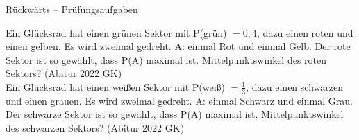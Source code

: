 \begin{aufgabe}{Rückwärts – Prüfungsaufgaben}
\begin{teile}
\teil Ein Glücksrad hat einen grünen Sektor mit P(grün) $= 0{,}4$, dazu einen roten und einen gelben. Es wird zweimal gedreht. A: einmal Rot und einmal Gelb. Der rote Sektor ist so gewählt, dass P(A) maximal ist. Mittelpunktswinkel des roten Sektors? \hfill (Abitur 2022 GK) \\ \leerfeld[°]
\teil Ein Glücksrad hat einen weißen Sektor mit P(weiß) $= \frac{1}{3}$, dazu einen schwarzen und einen grauen. Es wird zweimal gedreht. A: einmal Schwarz und einmal Grau. Der schwarze Sektor ist so gewählt, dass P(A) maximal ist. Mittelpunktswinkel des schwarzen Sektors? \hfill (Abitur 2022 GK) \\ \leerfeld[°]
\end{teile}
\end{aufgabe}
